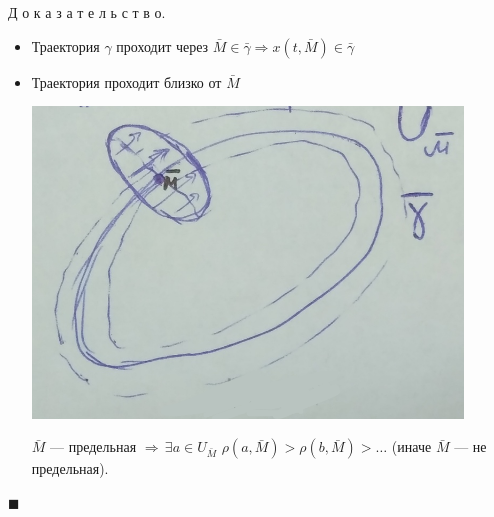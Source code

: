 \documentclass[oneside, final, 12pt]{article}
\theoremstyle{def}
\theoremstyle{th}
\theoremstyle{rem}
\renewenvironment{proof}{\par Д о к а з а т е л ь с т в о.}{\hfill$\blacksquare$}
\numberwithin{figure}{section}
\numberwithin{equation}{section}
\def\cntrKul{\hspace*{\fill}}
\begin{document}
	\begin{proof}
		\begin{itemize}
			\item Траектория $\gamma$ проходит через $\bar{M}\in\bar{\gamma}\Rightarrow x(t,\bar{M})	
																															\in\bar{\gamma}$
			\item Траектория проходит близко от $\bar{M}$
			\newline
			\begin{minipage}{0.3\textwidth}  \vspace{3mm}
				\begin{center} \includegraphics[width=0.9\textwidth]{pict/pict_10.png}\end{center} 
			\end{minipage}
				\hfill
			\begin{minipage}{0.6\textwidth} \vspace{4mm}
				\cntrKul $\bar{M}$ --- предельная $\Rightarrow \, \exists a \in U_{\bar{M}}$ \cntrKul \newline
				$\rho(a, \bar{M}) > \rho(b, \bar{M}) > \ldots $ (иначе $\bar{M}$ --- не предельная).
			\end{minipage}
				
		\end{itemize}
	\end{proof}
\end{document}
